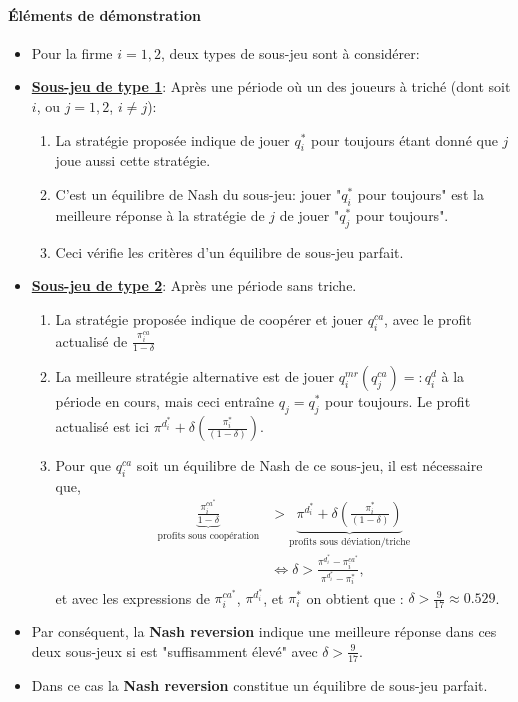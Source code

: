 \documentclass[notes, ignorenonframetext, compress, 9pt, xcolor=svgnames, aspectratio=169]{beamer}
\begin{document}
\begin{frame}[allowframebreaks]{\insertsection}
\framesubtitle{Éléments de démonstration}
\begin{itemize}
    \item Pour la firme $i=1, 2$, deux types de sous-jeu sont à considérer:
    \item \textbf{\underline{Sous-jeu de type 1}}:
    Après une période où un des joueurs à triché (dont soit $i$, ou $j=1, 2$, $i\neq j$):
    \begin{enumerate}[-]
        \item La stratégie proposée indique de jouer $q_i^*$ pour toujours étant donné que $j$ joue aussi 
        cette stratégie.  
        \item C'est un équilibre de Nash du sous-jeu: jouer "$q_i^*$ pour toujours" est la meilleure 
        réponse à la stratégie de $j$ de jouer "$q_j^*$ pour toujours".
        \item Ceci vérifie les critères d'un équilibre de sous-jeu parfait.
    \end{enumerate}
    \framebreak
    \item \textbf{\underline{Sous-jeu de type 2}}: Après une période sans triche.
    \begin{enumerate}[-]
        \item La stratégie proposée indique de coopérer et jouer $q_i^{ca}$, avec le profit actualisé de $\frac{\pi_i^{ca}}{1-\delta}$
        \item La meilleure stratégie alternative est de jouer $q_i^{mr}(q_j^{ca}) =: q_i^d$ à la période en cours,
         mais ceci entraîne $q_j =  q_j^*$ pour toujours. Le profit actualisé est ici 
          $\pi^{d^*_i}  + \delta\left(\frac{\pi_i^*}{(1-\delta)}\right)$.
         \item Pour que $q_i^{ca}$ soit un équilibre de Nash de ce sous-jeu, il est nécessaire que,
         \begin{align*}
            \underbrace{\frac{\pi_i^{ca^*}}{1-\delta}}_{\text{profits sous coopération}} &> \underbrace{\pi^{d^*_i} + \delta\left(\frac{\pi_i^*}{(1-\delta)}\right)}_{\text{profits sous déviation/triche}}\\
            &\Leftrightarrow \delta > \frac{\pi^{d^*_i} - \pi_i^{ca^*} }{\pi^{d^*_i}  - \pi_i^*},
            \end{align*}
         et avec les expressions de $\pi_i^{ca^*}$, $\pi^{d^*_i} $, et $\pi_i^*$   on obtient que : $\delta > \frac{9}{17}\approx 0.529$.
    \end{enumerate}
    \item Par conséquent, la \textbf{Nash reversion} indique une meilleure réponse dans ces deux sous-jeux 
    si est "suffisamment élevé" avec $\delta >\frac{9}{17}$. 
    \item Dans ce cas la \textbf{Nash reversion} constitue un équilibre de sous-jeu parfait.
\end{itemize}

\end{frame}
\end{document}
